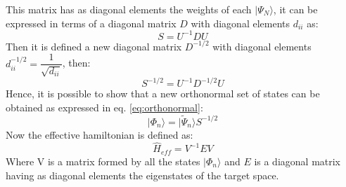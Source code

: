 \documentclass[12pt,twoside]{report}
\begin{document}
	This matrix has as diagonal elements the weights of each $|\Psi_N\rangle$, it can be expressed in terms of a diagonal matrix $D$ with diagonal elements $d_{ii}$ as:
	\begin{equation}
	    S=U^{-1}DU
	\end{equation}
	Then it is defined a new diagonal matrix $D^{-1\slash 2}$ with diagonal elements $d^{-1\slash 2}_{ii}=\dfrac{1}{\sqrt{d_{ii}}}$, then:
	\begin{equation}
	   S^{-1\slash 2}=U^{-1}D^{-1\slash 2}U 
	\end{equation}
	Hence, it is possible to show that a new orthonormal set of states can be obtained as expressed in eq. \ref{eq:orthonormal}:
	\begin{equation}
	   |\Phi_n \rangle=|\tilde{\Psi}_n \rangle S^{-1 \slash 2}
	   \label{eq:orthonormal}
	\end{equation}
	Now the effective hamiltonian is defined as:
	\begin{equation}
	    \hat{H}_{eff}=V^{-1}EV
	\end{equation}
	Where V is a matrix formed by all the states $|\Phi_n \rangle$ and $E$ is a diagonal matrix having as diagonal elements the eigenstates of the target space.
	
\end{document}
